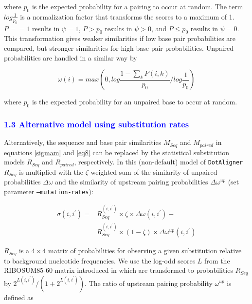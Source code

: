 \documentclass{bmcart}
\newcommand\dotaligner{\texttt{DotAligner}}
\begin{document}
\noindent where $p_0$ is the expected probability for a pairing to occur at random. The
term $log \frac{1}{p_0}$ is a normalization factor that transforms the scores to
a maximum of 1. $P==1$ results in $\psi=1$, $P>p_0$ results in $\psi>0$, and $P\le
p_0$ results in $\psi=0$.  This transformation gives weaker similarities if low
base pair probabilities are compared, but stronger similarities for high base pair
probabilities. Unpaired probabilities are handled in a similar way by

\begin{equation}\label{eq12}
	\omega(i) = max \left( 0, log \frac{1 - \sum_k P(i,k)}{p_0} / log \frac{1}{p_0} \right)
\end{equation}

\noindent  where $p_0$ is the expected probability for an unpaired base to occur at
random.

\textcolor{blue}{
\subsubsection*{1.3 Alternative model using substitution rates}
}

Alternatively, the sequence and base pair similarities $M_{Seq}$ and $M_{paired}$ in equations \ref{sigmam} and \ref{eq8} can be replaced by the statistical substitution models $R_{Seq}$ and $R_{paired}$, respectively. In this (non-default) model of \dotaligner{} $R_{Seq}$ is multiplied with the $\zeta$
weighted sum of the similarity of unpaired probabilities $\Delta \omega$ and the similarity of upstream
pairing probabilities $\Delta \omega^{up}$ (set parameter \texttt{--mutation-rates}):

\begin{equation}\label{sigmar}
\begin{aligned}
	\sigma(i,i^\prime) ={} & R_{Seq}^{(i,i^\prime)} \times \zeta \times \Delta \omega(i,i^\prime) +  \\
			       & R_{Seq}^{(i,i^\prime)} \times (1-\zeta) \times
	\Delta \omega^{up}(i,i^\prime)
\end{aligned}
\end{equation}

\noindent  $R_{Seq}$ is a $4\times4$ matrix of probabilities for observing
a given substitution relative to background nucleotide frequencies. We use the
log-odd scores $L$ from the RIBOSUM85-60 matrix introduced in
\cite{Klein14499004} which are transformed to probabilities $R_{Seq}$ by
$2^{L(i,i^\prime)} / (1 + 2^{L(i,i^\prime)})$. The ratio of upstream pairing probability
$\omega^{up}$ is defined as
\end{document}
